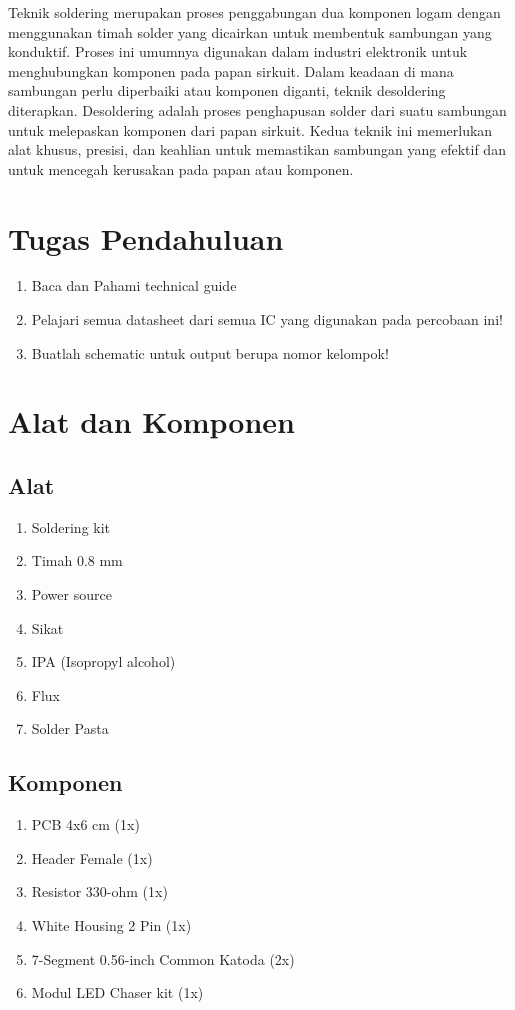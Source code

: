 Teknik soldering merupakan proses penggabungan dua komponen logam dengan menggunakan timah solder yang dicairkan untuk membentuk sambungan yang konduktif. 
Proses ini umumnya digunakan dalam industri elektronik untuk menghubungkan komponen pada papan sirkuit. Dalam keadaan di mana sambungan perlu diperbaiki 
atau komponen diganti, teknik desoldering diterapkan. Desoldering adalah proses penghapusan solder dari suatu sambungan untuk melepaskan komponen dari papan sirkuit. 
Kedua teknik ini memerlukan alat khusus, presisi, dan keahlian untuk memastikan sambungan yang efektif dan untuk mencegah kerusakan pada papan atau komponen.


\section{Tugas Pendahuluan}
\begin{enumerate}
    \item Baca dan Pahami technical guide
    \item Pelajari semua datasheet dari semua IC yang digunakan pada percobaan ini!
    \item Buatlah schematic untuk output berupa nomor kelompok!
\end{enumerate}

\section{Alat dan Komponen}
\subsection{Alat}
\begin{enumerate}
    \item Soldering kit
    \item Timah 0.8 mm
    \item Power source
    \item Sikat 
    \item IPA (Isopropyl alcohol)
    \item Flux
    \item Solder Pasta
\end{enumerate}

\subsection{Komponen}
\begin{enumerate}
    \item PCB 4x6 cm                        (1x)
    \item Header Female                     (1x)
    \item Resistor 330-ohm 			        (1x)
    \item White Housing 2 Pin			    (1x)
    \item 7-Segment 0.56-inch Common Katoda	(2x)
    \item Modul LED Chaser kit              (1x)
\end{enumerate}
